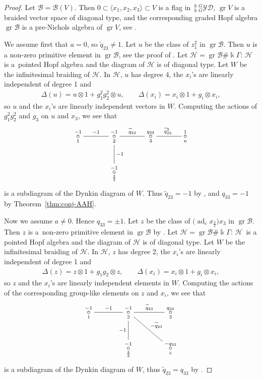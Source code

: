 \documentclass[pdftex]{sigma}
\numberwithin{equation}{section}
\newcommand{\adc}{\operatorname{ad}_c}
\newcommand{\gr}{\operatorname{gr}}
\newcommand{\toba}{\mathscr B}
\newcommand{\yd}[1]{{}_{#1}^{#1}\mathcal{YD}}
\newcommand{\tresdos}{\frac{3}{2}}
\begin{document}
\begin{proof}
Let $\toba=\toba(V)$. Then $0 \subset \langle x_1, x_2, x_3\rangle \subset V$ is a flag in $\yd{\Bbbk G}$, $\gr V$ is a braided vector space of diagonal type, and the corresponding graded Hopf algebra $\gr \toba$ is a pre-Nichols algebra of $\gr V$, see \cite[Lemma 3.4.2]{AAH-triang}.

We assume first that $a=0$, so $\widetilde{q}_{23}\ne 1$.
Let $u$ be the class of $z_1^2$ in $\gr \toba$. Then $u$ is a non-zero primitive element in $\gr \toba$, see the proof of \cite[Proposition 8.1.8]{AAH-triang}. Let $\mathcal{H}=\gr \toba\#\Bbbk\Gamma$: $\mathcal{H}$ is a~pointed Hopf algebra and the diagram of $\mathcal{H}$ is of diagonal type. Let $W$ be the infinitesimal braiding of $\mathcal{H}$. In $\mathcal{H}$, $u$ has degree 4, the $x_i$'s are linearly independent of degree 1 and
\begin{align*}
\Delta(u) =u\otimes 1+g_1^2g_2^2 \otimes u, \qquad \Delta(x_i)=x_i\otimes 1+g_i\otimes x_i,
\end{align*}
so $u$ and the $x_i$'s are linearly independent vectors in $W$.
Computing the actions of $g_1^2g_2^2$ and $g_3$ on $u$ and $x_3$, we see that
$$
\xymatrix@C=35pt{\overset{-1}{\underset{1}{\circ}} \ar@{-}[r]^{-1} & \overset{-1}{\underset{2}{\circ}} \ar@{-}[d]^{-1} \ar @{-}[r]^{\widetilde{q}_{23}} &
\overset{q_{33}}{\underset{3}{\circ}} \ar @{-}[r]^{\widetilde{q}_{23}^2} & \overset{1}{\underset{u}{\circ}}
\\ & \overset{-1}{\underset{\tresdos}{\circ}} & &}
$$
is a subdiagram of the Dynkin diagram of $W$. Thus $\widetilde{q}_{23}=-1$ by \cite[Lemma 2.3.7]{AAH-triang},
and $q_{33}=-1$ by Theorem~\ref{thm:conj-AAH}.

Now we assume $a\ne 0$. Hence $q_{33}= \pm 1$.
Let $z$ be the class of $\big(\adc x_{\tresdos}\big)x_3$ in $\gr \toba$. Then $z$ is a~non-zero primitive element in $\gr \toba$ by \cite[Propositions 8.1.6 and 8.1.7]{AAH-triang}. Let $\mathcal{H}=\gr \toba\#\Bbbk\Gamma$: $\mathcal{H}$~is a pointed Hopf algebra and the diagram of $\mathcal{H}$ is of diagonal type. Let $W$ be the infinitesimal braiding of $\mathcal{H}$. In $\mathcal{H}$, $z$ has degree 2, the $x_i$'s are linearly independent of degree 1 and
\begin{align*}
\Delta(z) =z\otimes 1+g_1g_2 \otimes z, \qquad \Delta(x_i)=x_i\otimes 1+g_i\otimes x_i,
\end{align*}
so $z$ and the $x_i$'s are linearly independent elements in $W$.
Computing the actions of the corresponding group-like elements on $z$ and $x_i$, we see that
$$
\xymatrix@C=40pt{\overset{-1}{\underset{1}{\circ}} \ar@{-}[r]^{-1} & \overset{-1}{\underset{2}{\circ}} \ar@{-}[d]_{-1} \ar @{-}[r]^{\widetilde{q}_{23}}
\ar@{-}[rd]^{-\widetilde{q}_{23}} & \overset{q_{33}}{\underset{3}{\circ}}
\\ & \overset{-1}{\underset{\tresdos}{\circ}} & \overset{-q_{33}}{\underset{z}{\circ}}}
$$
is a subdiagram of the Dynkin diagram of $W$, thus $\widetilde{q}_{23}=q_{33}$ by \cite[Lemma 2.3.7]{AAH-triang}.
\end{proof}
\end{document}
